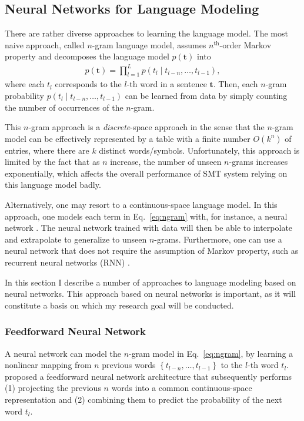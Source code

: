\documentclass[11pt, oneside]{essay}
\newcommand{\vect}[1]{\mathbf{#1}}
\newcommand{\vt}[0]{\vect{t}}
\begin{document}
\subsection{Neural Networks for Language Modeling}
\label{sec:nnlm}

There are rather diverse approaches to learning the language
model. The most naive approach, called $n$-gram language model,
assumes $n^{\text{th}}$-order Markov property and decomposes the
language model $p(\vt)$ into
\begin{align}
    \label{eq:ngram}
    p(\vt) = \prod_{l=1}^L p(t_l \mid t_{l-n}, \dots, t_{l-1}),
\end{align}
where each $t_l$ corresponds to the $l$-th word in a sentence
$\vt$. Then, each $n$-gram probability $p(t_l \mid t_{l-n},
\dots, t_{l-1})$ can be learned from data by simply counting the
number of occurrences of the $n$-gram. 

This $n$-gram approach is a \textit{discrete}-space approach in
the sense that the $n$-gram model can be effectively represented
by a table with a finite number $O(k^n)$ of entries, where there
are $k$ distinct words/symbols. Unfortunately, this approach is
limited by the fact that as $n$ increase, the number of unseen
$n$-grams increases exponentially, which affects the overall
performance of SMT system relying on this language model badly. 

Alternatively, one may resort to a continuous-space language
model. In this approach, one models each term in
Eq.~\eqref{eq:ngram} with, for instance, a neural network
\citep{Bengio2003}. The neural network trained with data will
then be able to interpolate and extrapolate to generalize to
unseen $n$-grams. Furthermore, one can use a neural network that
does not require the assumption of Markov property, such as
recurrent neural networks (RNN) \citep{Rumelhart1986,Mikolov2010}. 

In this section I describe a number of approaches to
language modeling based on neural networks. This approach based
on neural networks is important, as it will constitute a basis on
which my research goal will be conducted. 

\subsubsection{Feedforward Neural Network}

A neural network can model the $n$-gram model in
Eq.~\eqref{eq:ngram}, by learning a nonlinear mapping from $n$
previous words $\left\{ t_{l-n}, \dots, t_{l-1} \right\}$ to the
$l$-th word $t_l$. \citet{Bengio2003} proposed a feedforward
neural network architecture that subsequently performs (1)
projecting the previous $n$ words into a common continuous-space
representation and (2) combining them to predict the probability
of the next word $t_l$. 
\end{document}

